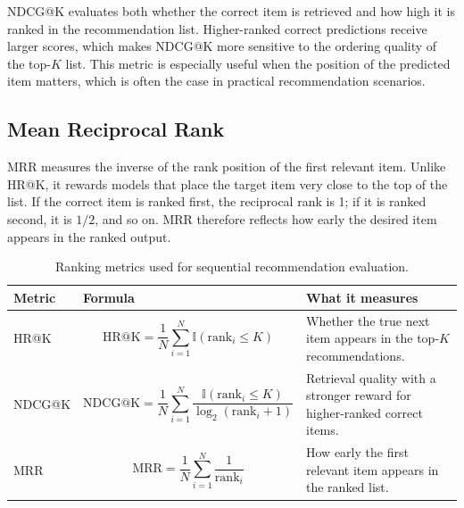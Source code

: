 \documentclass[12pt,a4paper]{report}
\begin{document}
NDCG@K evaluates both whether the correct item is retrieved and how high it is
ranked in the recommendation list. Higher-ranked correct predictions receive
larger scores, which makes NDCG@K more sensitive to the ordering quality of the
top-\(K\) list. This metric is especially useful when the position of the
predicted item matters, which is often the case in practical recommendation
scenarios.

\subsection{Mean Reciprocal Rank}

MRR measures the inverse of the rank position of the first relevant item.
Unlike HR@K, it rewards models that place the target item very close to the top
of the list. If the correct item is ranked first, the reciprocal rank is 1; if
it is ranked second, it is \(1/2\), and so on. MRR therefore reflects how early
the desired item appears in the ranked output.

\begin{table}[h]
\centering
\begin{tabular}{p{2.2cm} p{5.8cm} p{5.0cm}}
\toprule
\textbf{Metric} & \textbf{Formula} & \textbf{What it measures} \\
\midrule
HR@K &
{\small
\[
\mathrm{HR@K} = \frac{1}{N}\sum_{i=1}^{N}\mathbb{I}(\text{rank}_i \leq K)
\]}
&
Whether the true next item appears in the top-\(K\) recommendations. \\
\midrule
NDCG@K &
{\small
\[
\mathrm{NDCG@K} = \frac{1}{N}\sum_{i=1}^{N}\frac{\mathbb{I}(\text{rank}_i \leq K)}{\log_2(\text{rank}_i + 1)}
\]}
&
Retrieval quality with a stronger reward for higher-ranked correct items. \\
\midrule
MRR &
{\small
\[
\mathrm{MRR} = \frac{1}{N}\sum_{i=1}^{N}\frac{1}{\text{rank}_i}
\]}
&
How early the first relevant item appears in the ranked list. \\
\bottomrule
\end{tabular}
\caption{Ranking metrics used for sequential recommendation evaluation.}
\label{tab:evaluation_metrics}
\end{table}

\end{document}
